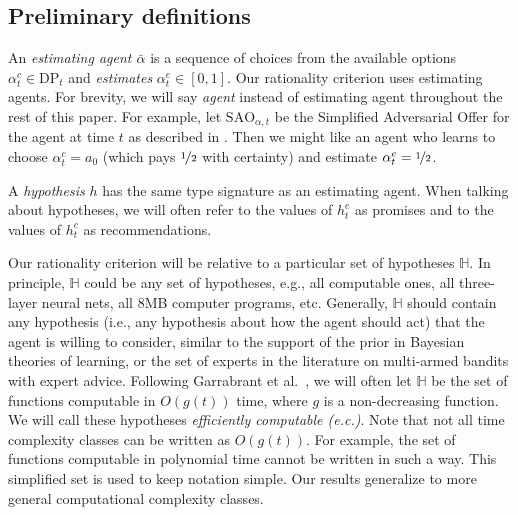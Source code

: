 \documentclass[submission,copyright,creativecommons]{eptcs}
\newcommand{\DP}{\mathrm{DP}}
\begin{document}
\subsection{Preliminary definitions}

%

An \textit{estimating agent $\bar \alpha$} is a sequence of choices from the available options $\alpha^c_t\in  \DP_t$ and \textit{estimates} $\alpha^e_t\in [0,1]$. Our rationality criterion uses estimating agents. For brevity, we will say \textit{agent} instead of estimating agent throughout the rest of this paper.
%
%
%
%
For example, let $\mathrm{SAO}_{\alpha,t}$ be the Simplified Adversarial Offer for the agent at time $t$ as described in . Then we might like an agent who learns to choose $\alpha_t^c=a_0$ (which pays $\nicefrac{1}{2}$ with certainty) and estimate $\alpha_t^e=\nicefrac{1}{2}$.
%

A \textit{hypothesis} $h$ has the same type signature as an estimating agent. When talking about hypotheses, we will often refer to the values of $h_t^e$ as promises and to the values of $h_t^c$ as recommendations.

Our rationality criterion will be relative to a particular set of hypotheses $\mathbb{H}$. In principle, $\mathbb{H}$ could be any set of hypotheses, e.g., all computable ones, all three-layer neural nets, all 8MB computer programs, etc. Generally, $\mathbb{H}$ should contain any hypothesis (i.e., any hypothesis about how the agent should act) that the agent is willing to consider, similar to the support of the prior in Bayesian theories of learning, or the set of experts in the literature on multi-armed bandits with expert advice.
Following Garrabrant et al.~\citeyear{Garrabrant2016}, we will often let $\mathbb{H}$ be the set of functions computable in $O(g(t))$ time, where $g$ is a non-decreasing function.
We will call these hypotheses \textit{efficiently computable (e.c.)}. Note that not all time complexity classes can be 
written as $O(g(t))$. For example, the set of functions computable in polynomial time cannot be written in such a way. This simplified set is used to keep notation simple. Our results generalize to more general
computational complexity classes.
%
\end{document}
